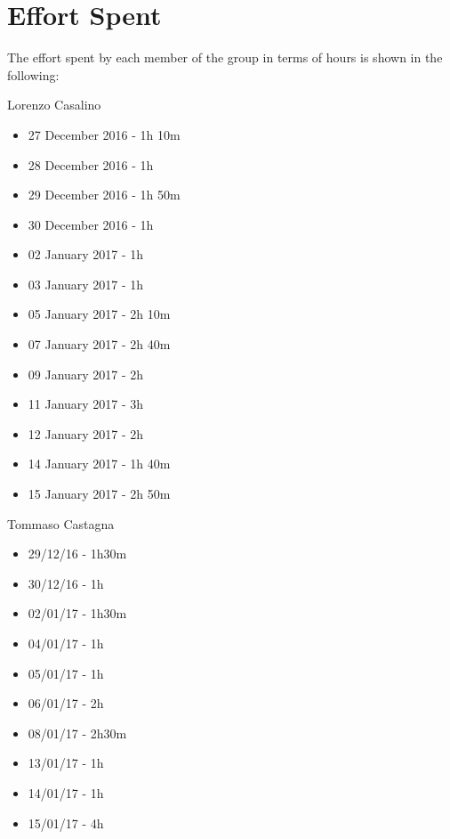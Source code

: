 \section{Effort Spent}

The effort spent by each member of the group in terms of hours is shown in the following:

Lorenzo Casalino

\begin{itemize}
	\item 27 December 2016 - 1h 10m
	\item 28 December 2016 - 1h
	\item 29 December 2016 - 1h 50m
	\item 30 December 2016 - 1h
	\item 02 January  2017 - 1h
	\item 03 January  2017 - 1h
	\item 05 January  2017 - 2h 10m
	\item 07 January  2017 - 2h 40m
	\item 09 January 2017 - 2h
	\item 11 January 2017 - 3h
	\item 12 January 2017 - 2h
	\item 14 January 2017 - 1h 40m
	\item 15 January 2017 - 2h 50m
\end{itemize}

Tommaso Castagna

\begin{itemize}
	\item 29/12/16 - 1h30m
	\item 30/12/16 - 1h
	\item 02/01/17 - 1h30m
	\item 04/01/17 - 1h
	\item 05/01/17 - 1h
	\item 06/01/17 - 2h
	\item 08/01/17 - 2h30m
	\item 13/01/17 - 1h
	\item 14/01/17 - 1h
	\item 15/01/17 - 4h
\end{itemize}
